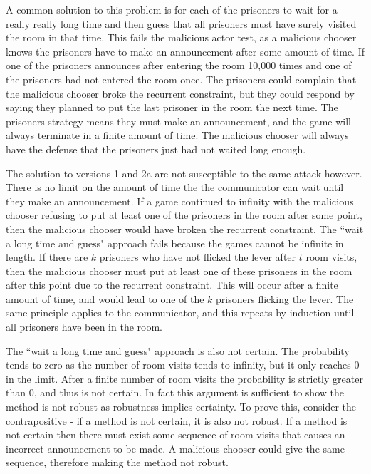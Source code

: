 A common solution to this problem is for each of the prisoners to wait for a really really long time and then guess that all prisoners must have surely visited the room in that time. This fails the malicious actor test, as a malicious chooser knows the prisoners have to make an announcement after some amount of time. If one of the prisoners announces after entering the room 10,000 times and one of the prisoners had not entered the room once. The prisoners could complain that the malicious chooser broke the recurrent constraint, but they could respond by saying they planned to put the last prisoner in the room the next time. The prisoners strategy means they must make an announcement, and the game will always terminate in a finite amount of time. The malicious chooser will always have the defense that the prisoners just had not waited long enough.

The solution to versions 1 and 2a are not susceptible to the same attack however. There is no limit on the amount of time the the communicator can wait until they make an announcement. If a game continued to infinity with the malicious chooser refusing to put at least one of the prisoners in the room after some point, then the malicious chooser would have broken the recurrent constraint. The ``wait a long time and guess" approach fails because the games cannot be infinite in length. If there are $k$ prisoners who have not flicked the lever after $t$ room visits, then the malicious chooser must put at least one of these prisoners in the room after this point due to the recurrent constraint. This will occur after a finite amount of time, and would lead to one of the $k$ prisoners flicking the lever. The same principle applies to the communicator, and this repeats by induction until all prisoners have been in the room.

\newpage

The ``wait a long time and guess" approach is also not certain. The probability tends to zero as the number of room visits tends to infinity, but it only reaches 0 in the limit. After a finite number of room visits the probability is strictly greater than 0, and thus is not certain. In fact this argument is sufficient to show the method is not robust as robustness implies certainty. To prove this, consider the contrapositive - if a method is not certain, it is also not robust. If a method is not certain then there must exist some sequence of room visits that causes an incorrect announcement to be made. A malicious chooser could give the same sequence, therefore making the method not robust.

